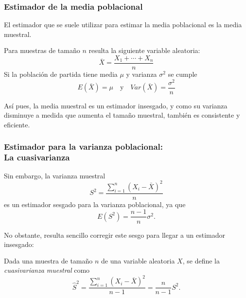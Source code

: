 \begin{frame}
\frametitle{Estimador de la media poblacional}
El estimador que se suele utilizar para estimar la media poblacional es la media muestral. 

Para muestras de tamaño $n$ resulta la siguiente variable aleatoria:
\[
\bar X = \frac{X_1+\cdots+X_n}{n}
\]
Si la población de partida tiene media $\mu$ y varianza $\sigma^2$ se cumple
\[
E(\bar X) = \mu \quad \mbox{y} \quad Var(\bar X)=\frac{\sigma^2}{n}
\]

Así pues, la media muestral es un estimador insesgado, y como su varianza disminuye a medida que aumenta el tamaño muestral, también es consistente y eficiente. 
\end{frame}


\begin{frame}
\frametitle{Estimador para la varianza poblacional:\\ La cuasivarianza}
Sin embargo, la varianza muestral 
\[
S^2 = \frac{\sum_{i=1}^n (X_i-\bar X)^2}{n}
\]
es un estimador sesgado para la varianza poblacional, ya que
\[
E(S^2)= \frac{n-1}{n}\sigma^2.
\]

No obstante, resulta sencillo corregir este sesgo para llegar a un estimador insesgado:

\begin{definicion}
Dada una muestra de tamaño $n$ de una variable aleatoria $X$, se define la \emph{cuasivarianza muestral} como
\[
\hat{S}^2 = \frac{\sum_{i=1}^n (X_i-\bar X)^2}{n-1} = \frac{n}{n-1}S^2.
\]
\end{definicion} 
\end{frame}


